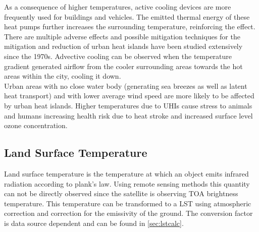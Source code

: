 As a consequence of higher temperatures, active cooling devices are more frequently used for buildings and vehicles. 
The emitted thermal energy of these heat pumps further increases the surrounding temperature, reinforcing the effect.
\\
There are multiple adverse effects and possible mitigation techniques for the mitigation and reduction of urban heat islands have been studied extensively since the 1970s\cite{Nichol1994}\cite{Stewart2011}. %
Advective cooling can be observed when the temperature gradient generated airflow from the cooler surrounding areas towards the hot areas within the city, cooling it down\cite{HaegerEugensson1999}. \\
Urban areas with no close water body (generating sea breezes as well as latent heat transport) and with lower average wind speed are more likely to be affected by urban heat islands\cite{Ramamurthy2017}. 
Higher temperatures due to \acp{UHI} cause stress to animals and humans increasing health risk due to heat stroke and increased surface level ozone concentration\cite{Santamouris2020}.
\subsection{Land Surface Temperature}
Land surface temperature is the temperature at which an object emits infrared radiation according to plank's law\cite{Liang2020}. 
Using remote sensing methods this quantity can not be directly observed since the satellite is observing \ac{TOA} brightness temperature. 
This temperature can be transformed to a \ac{LST} using atmospheric correction and correction for the emissivity of the ground.
The conversion factor is data source dependent and can be found in \cref{sec:lstcalc}.
